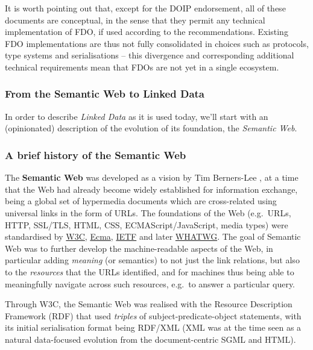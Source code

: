 It is worth pointing out that, except for the DOIP endorsement, all of these documents are conceptual, in the sense that they permit any technical implementation of FDO, if used according to the recommendations. 
Existing FDO implementations \cite{wittenburgFAIRDigitalObject2022b} are thus not fully consolidated in choices such as protocols, type systems and serialisations -- this divergence and corresponding additional technical requirements mean that FDOs are not yet in a single ecosystem.


\subsubsection{From the Semantic Web to Linked Data}\label{ch3:ld}

In order to describe \emph{Linked Data} as it is used today, we'll start with an (opinionated) description of the evolution of its foundation, the \emph{Semantic Web}.

\subsubsection*{A brief history of the Semantic Web}\label{ch3:semweb}

The \textbf{Semantic Web} was developed as a vision by Tim Berners-Lee \cite{berners-leeWeavingWebOriginal1999}, at a time that the Web had already become widely established for information exchange, being a global set of hypermedia documents which are cross-related using universal links in the form of URLs. The foundations of the Web (e.g.~URLs, HTTP, SSL/TLS, HTML, CSS, ECMAScript/JavaScript, media types) were standardised by \href{https://www.w3.org/standards/}{W3C}, \href{https://www.ecma-international.org/}{Ecma}, \href{https://www.ietf.org/standards/}{IETF} and later \href{https://whatwg.org/}{WHATWG}. The goal of Semantic Web was to further develop the machine-readable aspects of the Web, in particular adding \emph{meaning} (or semantics) to not just the link relations, but also to the \emph{resources} that the URLs identified, and for machines thus being able to meaningfully navigate across such resources, e.g.~to answer a particular query.

Through W3C, the Semantic Web was realised with the Resource Description Framework (RDF) \cite{w3-rdf11-primer} that used \emph{triples} of subject-predicate-object statements, with its initial serialisation format \cite{w3-rdf-syntax99} being RDF/XML (XML was at the time seen as a natural data-focused evolution from the document-centric SGML and HTML).

